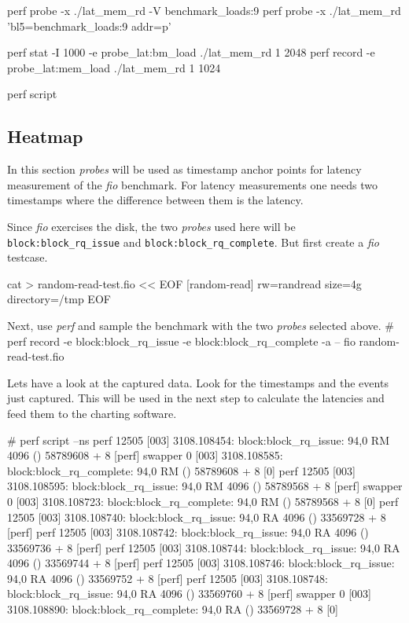  perf probe -x ./lat_mem_rd -V benchmark_loads:9
 perf probe -x ./lat_mem_rd  'bl5=benchmark_loads:9 addr=p'

 perf stat -I 1000 -e probe_lat:bm_load ./lat_mem_rd 1 2048
 perf record -e probe_lat:mem_load ./lat_mem_rd 1 1024

 perf script
\stoptyping


\subsection[ssub:heatmap]{Heatmap}

In this section {\em probes}
will be used as timestamp anchor points for latency measurement of the
{\em fio} benchmark. For latency measurements one needs two timestamps
where the difference between them is the latency.

Since {\em fio} exercises the disk, the two {\em probes} used here will
be {\tt block:block_rq_issue} and {\tt block:block_rq_complete}.
But first create a {\em fio} testcase.

\starttyping
cat > random-read-test.fio << EOF
[random-read]
rw=randread
size=4g
directory=/tmp
EOF
\stoptyping

Next, use {\em perf} and sample the benchmark with the two {\em probes}
selected above.
\starttyping
# perf record -e block:block_rq_issue -e block:block_rq_complete -a -- fio random-read-test.fio
\stoptyping

Lets have a look at the captured data. Look for the timestamps and the events
just captured. This will be used in the next step to calculate the latencies
and feed them to the charting software.

\starttyping
# perf script --ns
            perf 12505 [003]  3108.108454:    block:block_rq_issue: 94,0 RM 4096 () 58789608 + 8 [perf]
         swapper     0 [003]  3108.108585: block:block_rq_complete: 94,0 RM () 58789608 + 8 [0]
            perf 12505 [003]  3108.108595:    block:block_rq_issue: 94,0 RM 4096 () 58789568 + 8 [perf]
         swapper     0 [003]  3108.108723: block:block_rq_complete: 94,0 RM () 58789568 + 8 [0]
            perf 12505 [003]  3108.108740:    block:block_rq_issue: 94,0 RA 4096 () 33569728 + 8 [perf]
            perf 12505 [003]  3108.108742:    block:block_rq_issue: 94,0 RA 4096 () 33569736 + 8 [perf]
            perf 12505 [003]  3108.108744:    block:block_rq_issue: 94,0 RA 4096 () 33569744 + 8 [perf]
            perf 12505 [003]  3108.108746:    block:block_rq_issue: 94,0 RA 4096 () 33569752 + 8 [perf]
            perf 12505 [003]  3108.108748:    block:block_rq_issue: 94,0 RA 4096 () 33569760 + 8 [perf]
         swapper     0 [003]  3108.108890: block:block_rq_complete: 94,0 RA () 33569728 + 8 [0]

